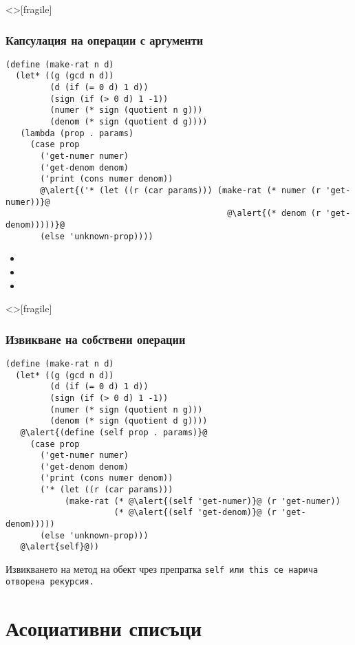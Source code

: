 \documentclass[alsotrans,beameroptions={aspectratio=169}]{beamerswitch}
\begin{document}
\begin{frame}<>[fragile]
  \frametitle{Капсулация на операции с аргументи}

\sizeboth\footnotesize
\begin{lstlisting}
(define (make-rat n d)
  (let* ((g (gcd n d))
         (d (if (= 0 d) 1 d))
         (sign (if (> 0 d) 1 -1))
         (numer (* sign (quotient n g)))
         (denom (* sign (quotient d g))))
   (lambda (prop . params)
     (case prop
       ('get-numer numer)
       ('get-denom denom)
       ('print (cons numer denom))
       @\alert{('* (let ((r (car params))) (make-rat (* numer (r 'get-numer))}@
                                             @\alert{(* denom (r 'get-denom)))))}@
       (else 'unknown-prop))))
\end{lstlisting}
\vspace*{-.5ex}
  \pause
  \begin{itemize}
  \item {}
  \item {}
  \item {}
  \end{itemize}
\end{frame}

\begin{frame}<>[fragile]
  \frametitle{Извикване на собствени операции}

\sizeboth\footnotesize
\begin{lstlisting}
(define (make-rat n d)
  (let* ((g (gcd n d))
         (d (if (= 0 d) 1 d))
         (sign (if (> 0 d) 1 -1))
         (numer (* sign (quotient n g)))
         (denom (* sign (quotient d g))))
   @\alert{(define (self prop . params)}@
     (case prop
       ('get-numer numer)
       ('get-denom denom)
       ('print (cons numer denom))
       ('* (let ((r (car params)))
            (make-rat (* @\alert{(self 'get-numer)}@ (r 'get-numer))
                      (* @\alert{(self 'get-denom)}@ (r 'get-denom)))))
       (else 'unknown-prop)))
   @\alert{self}@))
\end{lstlisting}
  \pause
  Извикването на метод на обект чрез препратка \tt{self} или \tt{this} се нарича \alert{отворена рекурсия}.
\end{frame}

\section{Асоциативни списъци}
\end{document}
